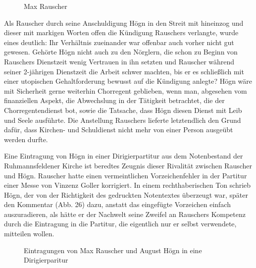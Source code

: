 \begin{figure}
\caption{Max Rauscher}
\end{figure}

Als Rauscher durch seine Anschuldigung Högn in den Streit mit hineinzog
und dieser mit markigen Worten offen die Kündigung Rauschers verlangte,
wurde eines deutlich: Ihr Verhältnis zueinander war offenbar auch
vorher nicht gut gewesen. Gehörte Högn nicht auch zu den Nörglern, die
schon zu Beginn von Rauschers Dienstzeit wenig Vertrauen in ihn setzten
und Rauscher während seiner 2-jährigen Dienstzeit die Arbeit schwer
machten, bis er es schließlich mit einer utopischen Gehaltforderung
bewusst auf die Kündigung anlegte? Högn wäre mit Sicherheit gerne
weiterhin Chorregent geblieben, wenn man, abgesehen vom finanziellen
Aspekt, die Abwechslung in der Tätigkeit betrachtet, die der
Chorregentendienst bot, sowie die Tatsache, dass Högn diesen Dienst mit
Leib und Seele ausführte. Die Anstellung Rauschers lieferte
letztendlich den Grund dafür, dass Kirchen- und Schuldienst nicht mehr
von einer Person ausgeübt werden durfte.

Eine Eintragung von Högn in einer Dirigierpartitur aus dem Notenbestand
der Ruhmannsfeldener Kirche ist beredtes Zeugnis dieser Rivalität
zwischen Rauscher und Högn. Rauscher hatte einen vermeintlichen
Vorzeichenfehler in der Partitur einer Messe von Vinzenz Goller
korrigiert. In einem rechthaberischen Ton schrieb Högn, der von der
Richtigkeit des gedruckten Notentextes überzeugt war, später den
Kommentar (Abb. 26) dazu, anstatt das eingefügte Vorzeichen einfach
auszuradieren, als hätte er der Nachwelt seine Zweifel an Rauschers
Kompetenz durch die Eintragung in die Partitur, die eigentlich nur er
selbst verwendete, mitteilen wollen.

\begin{figure}
\caption{Eintragungen von Max Rauscher und August Högn in eine Dirigierparitur}
\end{figure}


